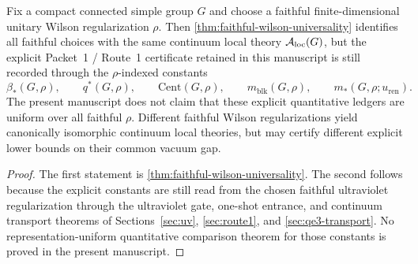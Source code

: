 
\begin{corollary}\label{cor:rho-indexed-ledger}
Fix a compact connected simple group $G$ and choose a faithful finite-dimensional unitary Wilson regularization $\rho$. Then \cref{thm:faithful-wilson-universality} identifies all faithful choices with the same continuum local theory $\mathcal{A}_{\mathrm{loc}}(G)$, but the explicit Packet~1 / Route~1 certificate retained in this manuscript is still recorded through the $\rho$-indexed constants
\[
\beta_*(G,\rho),\qquad q^*(G,\rho),\qquad \mathrm{Cent}(G,\rho),\qquad m_{\mathrm{blk}}(G,\rho),\qquad m_*(G,\rho;u_{\mathrm{ren}}).
\]
The present manuscript does not claim that these explicit quantitative ledgers are uniform over all faithful $\rho$. Different faithful Wilson regularizations yield canonically isomorphic continuum local theories, but may certify different explicit lower bounds on their common vacuum gap.
\end{corollary}

\begin{proof}
The first statement is \cref{thm:faithful-wilson-universality}. The second follows because the explicit constants are still read from the chosen faithful ultraviolet regularization through the ultraviolet gate, one-shot entrance, and continuum transport theorems of Sections~\ref{sec:uv}, \ref{sec:route1}, and \ref{sec:qe3-transport}. No representation-uniform quantitative comparison theorem for those constants is proved in the present manuscript.
\end{proof}

